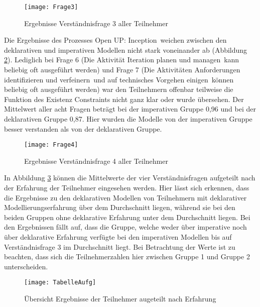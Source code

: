 \begin{figure}[htp]
\begin{center}
  \texttt{[image: Frage3]} %
  \caption{Ergebnisse Verständnisfrage 3 aller Teilnehmer}
  \label{fig:Frage3}
\end{center}
\end{figure}

Die Ergebnisse des Prozesses \grqq Open UP: Inception\grqq \ weichen zwischen den deklarativen und imperativen Modellen nicht stark voneinander ab (Abbildung \ref{fig:Frage4}). \newline
Lediglich bei Frage 6 (\grqq Die Aktivität \grqq Iteration planen und managen\grqq \ kann beliebig oft ausgeführt werden\grqq) und Frage 7 (\grqq Die Aktivitäten \grqq Anforderungen identifizieren und verfeinern\grqq \ und \grqq auf technisches Vorgehen einigen\grqq \ können beliebig oft ausgeführt werden) war den Teilnehmern offenbar teilweise die Funktion des Existenz Constraints nicht ganz klar oder wurde übersehen.\newline
Der Mittelwert aller acht Fragen beträgt bei der imperativen Gruppe 0,96 und bei der deklarativen Gruppe 0,87. Hier wurden die Modelle von der imperativen Gruppe besser verstanden als von der deklarativen Gruppe. \newline


\begin{figure}[htp]
\begin{center}
  \texttt{[image: Frage4]} %
  \caption{Ergebnisse Verständnisfrage 4 aller Teilnehmer}
  \label{fig:Frage4}
\end{center}
\end{figure}

In Abbildung \ref{fig:TabelleAufg} können die Mittelwerte der vier Verständnisfragen aufgeteilt nach der Erfahrung der Teilnehmer eingesehen werden. Hier lässt sich erkennen, dass die Ergebnisse zu den deklarativen Modellen von Teilnehmern mit deklarativer Modellierungserfahrung über dem Durchschnitt liegen, während sie bei den beiden Gruppen ohne deklarative Erfahrung unter dem Durchschnitt liegen. \newline
Bei den Ergebnissen fällt auf, dass die Gruppe, welche weder über imperative noch über deklarative Erfahrung verfügte bei den imperativen Modellen bis auf Verständnisfrage 3 im Durchschnitt liegt. Bei Betrachtung der Werte ist zu beachten, dass sich die Teilnehmerzahlen hier zwischen Gruppe 1 und Gruppe 2 unterscheiden.\newline
\begin{figure}[htp]
\begin{center}
  \texttt{[image: TabelleAufg]} %
  \caption{Übersicht Ergebnisse der Teilnehmer augeteilt nach Erfahrung}
  \label{fig:TabelleAufg}
\end{center}
\end{figure}




